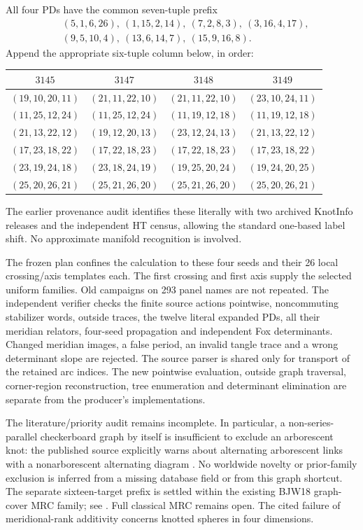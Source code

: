 \documentclass[11pt]{article}
\begin{document}
All four PDs have the common seven-tuple prefix
\begin{align*}
 &(5,1,6,26),\ (1,15,2,14),\ (7,2,8,3),\ (3,16,4,17),\\
 &(9,5,10,4),\ (13,6,14,7),\ (15,9,16,8).
\end{align*}
Append the appropriate six-tuple column below, in order:
\begin{center}\small
\begin{tabular}{cccc}
\toprule
$3145$&$3147$&$3148$&$3149$\\\midrule
$(19,10,20,11)$&$(21,11,22,10)$&$(21,11,22,10)$&$(23,10,24,11)$\\
$(11,25,12,24)$&$(11,25,12,24)$&$(11,19,12,18)$&$(11,19,12,18)$\\
$(21,13,22,12)$&$(19,12,20,13)$&$(23,12,24,13)$&$(21,13,22,12)$\\
$(17,23,18,22)$&$(17,22,18,23)$&$(17,22,18,23)$&$(17,23,18,22)$\\
$(23,19,24,18)$&$(23,18,24,19)$&$(19,25,20,24)$&$(19,24,20,25)$\\
$(25,20,26,21)$&$(25,21,26,20)$&$(25,21,26,20)$&$(25,20,26,21)$\\
\bottomrule
\end{tabular}
\end{center}
The earlier provenance audit identifies these literally
with two archived KnotInfo releases and the independent
HT census, allowing the standard one-based label shift.
No approximate manifold recognition is involved.

The frozen plan confines the calculation to these four
seeds and their 26 local crossing/axis templates each.
The first crossing and first axis supply the selected
uniform families. Old campaigns on 293 panel names are
not repeated. The independent verifier checks the finite
source actions pointwise, noncommuting stabilizer words,
outside traces, the twelve literal expanded PDs, all their
meridian relators, four-seed propagation and independent
Fox determinants. Changed meridian images, a false period,
an invalid tangle trace and a wrong determinant slope are
rejected. The source parser is shared only for transport
of the retained arc indices. The new pointwise evaluation,
outside graph traversal, corner-region reconstruction,
tree enumeration and determinant elimination are separate
from the producer's implementations.

The literature/priority audit remains incomplete. In
particular, a non-series-parallel checkerboard graph by
itself is insufficient to exclude an arborescent knot:
the published source explicitly warns about alternating
arborescent links with a nonarborescent alternating diagram
\cite[Proposition 6.3 and Remark 6.4]{stoim}.
No worldwide novelty or prior-family exclusion is inferred
from a missing database field or from this graph shortcut.
The separate sixteen-target prefix is settled within the existing
BJW18 graph-cover MRC family; see
. Full classical MRC
remains open. The cited failure of meridional-rank
additivity concerns knotted spheres in four dimensions.
\end{document}
